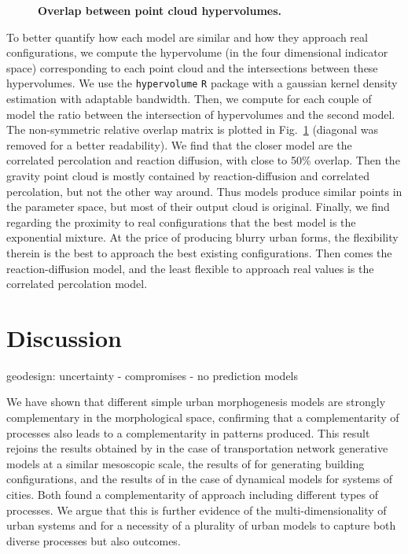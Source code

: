 \documentclass[10pt,letterpaper]{article}
\begin{document}
\begin{figure}[!h]
	\vspace{2cm}
	\caption{{\bf Overlap between point cloud hypervolumes.}\label{fig:fig5}}
\end{figure}

To better quantify how each model are similar and how they approach real configurations, we compute the hypervolume (in the four dimensional indicator space) corresponding to each point cloud and the intersections between these hypervolumes. We use the \texttt{hypervolume} \texttt{R} package \cite{hypervolume} with a gaussian kernel density estimation with adaptable bandwidth. Then, we compute for each couple of model the ratio between the intersection of hypervolumes and the second model. The non-symmetric relative overlap matrix is plotted in Fig.~\ref{fig:fig5} (diagonal was removed for a better readability). We find that the closer model are the correlated percolation and reaction diffusion, with close to 50\% overlap. Then the gravity point cloud is mostly contained by reaction-diffusion and correlated percolation, but not the other way around. Thus models produce similar points in the parameter space, but most of their output cloud is original. Finally, we find regarding the proximity to real configurations that the best model is the exponential mixture. At the price of producing blurry urban forms, the flexibility therein is the best to approach the best existing configurations. Then comes the reaction-diffusion model, and the least flexible to approach real values is the correlated percolation model.

\section*{Discussion}

geodesign: uncertainty - compromises - no prediction models


We have shown that different simple urban morphogenesis models are strongly complementary in the morphological space, confirming that a complementarity of processes also leads to a complementarity in patterns produced. This result rejoins the results obtained by \cite{raimbault2018multi} in the case of transportation network generative models at a similar mesoscopic scale, the results of \cite{raimbault2019generating} for generating building configurations, and the results of \cite{raimbault2018systematic} in the case of dynamical models for systems of cities. Both found a complementarity of approach including different types of processes. We argue that this is further evidence of the multi-dimensionality of urban systems and for a necessity of a plurality of urban models to capture both diverse processes but also outcomes.
\end{document}

